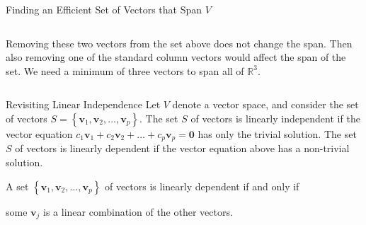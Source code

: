 \documentclass[xcolor=dvipsnames,aspectratio=169,t]{beamer}
\begin{document}
\begin{frame}{Finding an Efficient Set of Vectors that Span $V$}
\begin{columns}[T]
\pause
\bi
\ii Removing these two vectors from the set above does not change the span.
\ii Then also removing one of the standard column vectors would affect the span of the set.
\ii We need a minimum of three vectors to span all of $\mathbb{R}^3$.
\ei

\end{columns}

\end{frame} 

\begin{frame}{Revisiting Linear Independence}
  \bbox
  Let $V$ denote a vector space, and consider the set of vectors $S = \left\{ \mathbf{v}_1 ,  \mathbf{v}_2 , \ldots ,  \mathbf{v}_p \right\}$.%
  \bi
  \ii The set $S$ of vectors is \alert{linearly independent} if the vector equation $c_1  \mathbf{v}_1 + c_2  \mathbf{v}_2 + \ldots + c_p  \mathbf{v}_p = \mathbf{0}$ has \alert{only the trivial solution}. \ms
  \ii The set $S$ of vectors is \alert{linearly dependent} if the vector equation above has a \alert{non-trivial solution}.
  \ei
  \ebox

  \pause
  \begin{theorem}
  A set $\left\{ \mathbf{v}_1 ,  \mathbf{v}_2 , \ldots ,  \mathbf{v}_p \right\}$ of vectors is \alert{linearly dependent} if and only if
  \smallskip

  \qquad some $\mathbf{v}_j$ is a linear combination of the other vectors.
  \end{theorem}
\end{frame}
\end{document}

